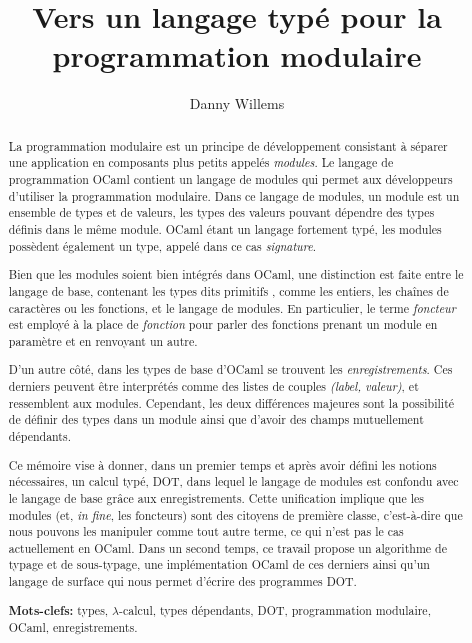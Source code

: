 \documentclass[11pt, twocolumn]{article}
\author{Danny Willems}
\title{Vers un langage typé pour la programmation modulaire}
\date{}
\begin{document}
\maketitle
\begin{abstract}
La programmation modulaire est un principe de développement consistant à séparer une application en composants plus petits appelés \textit{modules}. Le langage de
programmation OCaml contient un langage de modules qui permet aux développeurs
d'utiliser la programmation modulaire. Dans ce langage de modules, un module est
un ensemble de types et de valeurs, les types des valeurs pouvant dépendre des
types définis dans le même module.
OCaml étant un langage fortement typé, les modules possèdent également
un type, appelé dans ce cas \textit{signature}.


Bien que les modules soient bien intégrés dans OCaml, une
distinction est faite entre le langage de base, contenant les types dits
\og primitifs \fg, comme les entiers, les chaînes de caractères ou les fonctions, et le
langage de modules. En particulier, le terme \textit{foncteur} est employé à la
place de \textit{fonction} pour parler des fonctions prenant un module en
paramètre et en renvoyant un autre.

D'un autre côté, dans les types de base d'OCaml se trouvent les
\textit{enregistrements}. Ces derniers peuvent être interprétés comme des listes
de couples \textit{(label, valeur)}, et ressemblent aux modules. Cependant, les deux
différences majeures sont la possibilité de définir des types dans un
module ainsi que d'avoir des champs mutuellement dépendants.

Ce mémoire vise à donner, dans un premier temps et après avoir défini les notions
nécessaires, un calcul typé, DOT, dans lequel le
langage de modules est confondu avec le langage de base grâce aux
enregistrements. Cette unification implique
que les modules (et, \textit{in fine}, les foncteurs) sont des citoyens de première
classe, c'est-à-dire que nous pouvons les manipuler comme tout autre terme, ce qui
n'est pas le cas actuellement en OCaml.
Dans un second temps, ce travail propose un algorithme de typage et de
sous-typage, une implémentation OCaml de ces derniers ainsi qu'un langage de
surface qui nous permet d'écrire des programmes DOT.

\hspace{10mm}

\textbf{Mots-clefs: } types, $\lambda$-calcul, types dépendants,
DOT, programmation modulaire, OCaml, enregistrements.

\end{abstract}
\end{document}
